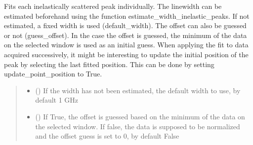 \documentclass[letterpaper,10pt,english]{sphinxmanual}
\begin{document}
\begin{fulllineitems}
\begin{fulllineitems}
\label{\detokenize{source/_autosummary/HDF5_BLS_treat.Treat:HDF5_BLS_treat.Treat.single_fit_all_inelastic}}
\pysigstartsignatures
\pysiglinewithargsret
{}
{\sphinxparamcomma {}\sphinxparamcomma {}\sphinxparamcomma {}\sphinxparamcomma {}}
{}
\pysigstopsignatures
\sphinxAtStartPar
Fits each inelastically scattered peak individually. The linewidth can be estimated beforehand using the function estimate\_width\_inelastic\_peaks. If not estimated, a fixed width is used (default\_width). The offset can also be guessed or not (guess\_offset). In the case the offset is guessed, the minimum of the data on the selected window is used as an initial guess.
When applying the fit to data acquired successively, it might be interesting to update the initial position of the peak by selecting the last fitted position. This can be done by setting update\_point\_position to True.
\begin{quote}\begin{description}
\begin{itemize}
\item {} 
\sphinxAtStartPar
{} (\sphinxstyleliteralemphasis{\sphinxupquote{, }}) \textendash{} If the width has not been estimated, the default width to use, by default 1 GHz

\item {} 
\sphinxAtStartPar
{} (\sphinxstyleliteralemphasis{\sphinxupquote{, }}) \textendash{} If True, the offset is guessed based on the minimum of the data on the selected window. If false, the data is supposed to be normalized and the offset guess is set to 0, by default False


\end{itemize}
\end{description}
\end{quote}
\end{fulllineitems}
\end{fulllineitems}
\end{document}

